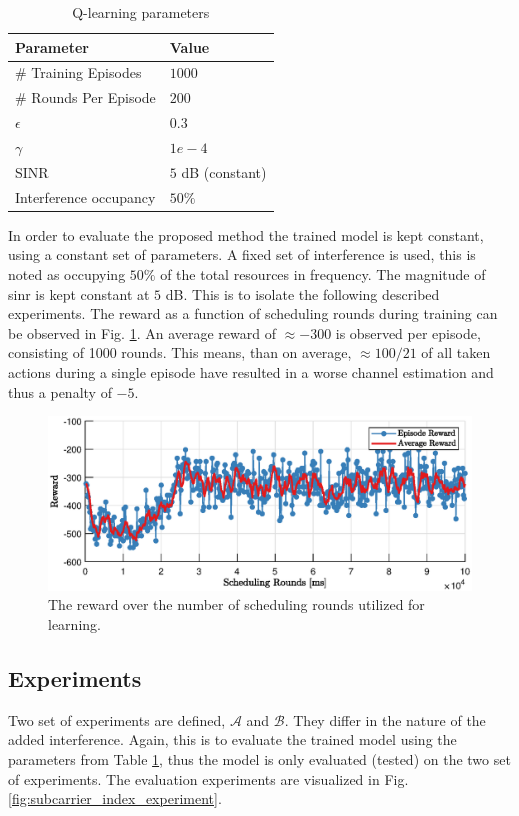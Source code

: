 \begin{table}[h]
\centering
\begin{tabular}{l|l}
\toprule
\textbf{Parameter}                 & \textbf{Value} \\ \midrule
\# Training Episodes & $1000$ \\
\# Rounds Per Episode & $200$ \\
$\epsilon$ & $0.3$\\
$\gamma$ & $1e-4$ \\
SINR & $5$ dB (constant) \\
Interference occupancy & $50\%$
\end{tabular}
\vspace{1em}
\caption{Q-learning parameters}
\label{tab:q_learning_param}
\end{table}

In order to evaluate the proposed method the trained model is kept constant, using a constant set of parameters. A fixed set of interference is used, this is noted as occupying $50\%$ of the total resources in frequency. The magnitude of \gls{sinr} is kept constant at $5$ dB. This is to isolate the following described experiments. The reward as a function of scheduling rounds during training can be observed in Fig. \ref{fig:training_stats_qlearning}. An average reward of $\approx -300$ is observed per episode, consisting of 1000 rounds. This means, than on average, $\approx 100/21$ of all taken actions during a single episode have resulted in a worse channel estimation and thus a penalty of $-5$.
\begin{figure}
    \centering
    \includegraphics{chapters/part_uplink/figures/results/training_statistics.eps}
    \caption{The reward over the number of scheduling rounds utilized for learning. }\label{fig:training_stats_qlearning}
\end{figure}
\subsection{Experiments}
Two set of experiments are defined, $\mathcal{A}$ and $\mathcal{B}$. They differ in the nature of the added interference. Again, this is to evaluate the trained model using the parameters from Table \ref{tab:q_learning_param}, thus the model is only evaluated (tested) on the two set of experiments. The evaluation experiments are visualized in Fig. \ref{fig:subcarrier_index_experiment}.



